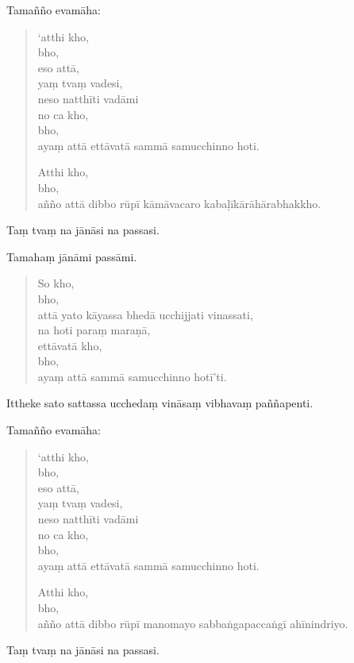 \documentclass[11pt,twoside,openright]{book}
\begin{document}
\pstart
Tamañño evamāha:
\pend

\begin{verse}
‘atthi kho,\\
\vin  bho,\\
\vin  eso attā,\\
\vin  yaṃ tvaṃ vadesi,\\
\vin  neso natthīti vadāmi\\


no ca kho,\\
\vin  bho,\\
\vin  ayaṃ attā ettāvatā sammā samucchinno hoti.

Atthi kho,\\
\vin  bho,\\
\vin  añño attā dibbo rūpī kāmāvacaro kabaḷīkārāhārabhakkho.

\end{verse}
\pstart
Taṃ tvaṃ na jānāsi na passasi.
\pend

\pstart
Tamahaṃ jānāmi passāmi.
\pend

\begin{verse}
So kho,\\
\vin  bho,\\
\vin  attā yato kāyassa bhedā ucchijjati vinassati,\\
\vin  na hoti paraṃ maraṇā,\\
\vin  ettāvatā kho,\\
\vin  bho,\\
\vin  ayaṃ attā sammā samucchinno hotī’ti.

\end{verse}
\pstart
Ittheke sato sattassa ucchedaṃ vināsaṃ vibhavaṃ paññapenti.
\pend

\pstart
Tamañño evamāha:
\pend

\begin{verse}
‘atthi kho,\\
\vin  bho,\\
\vin  eso attā,\\
\vin  yaṃ tvaṃ vadesi,\\
\vin  neso natthīti vadāmi\\


no ca kho,\\
\vin  bho,\\
\vin  ayaṃ attā ettāvatā sammā samucchinno hoti.

Atthi kho,\\
\vin  bho,\\
\vin  añño attā dibbo rūpī manomayo sabbaṅgapaccaṅgī ahīnindriyo.

\end{verse}
\pstart
Taṃ tvaṃ na jānāsi na passasi.
\pend
\end{document}
